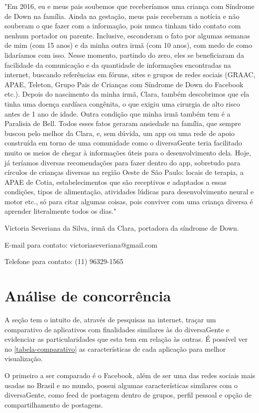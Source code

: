 "Em 2016, eu e meus pais soubemos que receberíamos uma criança com Síndrome de Down na família. Ainda na gestação, meus pais receberam a notícia e não souberam o que fazer com a informação, pois nunca tinham tido contato com nenhum portador ou parente. Inclusive, esconderam o fato por algumas semanas de mim (com 15 anos) e da minha outra irmã (com 10 anos), com medo de como lidaríamos com isso. Nesse momento, partindo do zero, eles se beneficiaram da facilidade da comunicação e da quantidade de informações encontradas na internet, buscando referências em fóruns, sites e grupos de redes sociais (GRAAC, APAE, Teleton, Grupo Pais de Crianças com Síndrome de Down do Facebook etc.). Depois do nascimento da minha irmã, Clara, também descobrimos que ela tinha uma doença cardíaca congênita, o que exigiu uma cirurgia de alto risco antes de 1 ano de idade. Outra condição que minha irmã também tem é a Paralisia de Bell. Todos esses fatos geraram ansiedade na família, que sempre buscou pelo melhor da Clara, e, sem dúvida, um app ou uma rede de apoio construída em torno de uma comunidade como o diversaGente teria facilitado muito os meios de chegar à informações úteis para o desenvolvimento dela. Hoje, já teríamos diversas recomendações para fazer dentro do app, sobretudo para círculos de crianças diversas na região Oeste de São Paulo: locais de terapia, a APAE de Cotia, estabelecimentos que são receptivos e adaptados a essas condições, tipos de alimentação, atividades lúdicas para desenvolvimento neural e motor etc., só para citar algumas coisas, pois conviver com uma criança diversa é aprender literalmente todos os dias."

Victoria Severiana da Silva, irmã da Clara, portadora da síndrome de Down.


E-mail para contato: victoriaseveriana@gmail.com


Telefone para contato: (11) 96329-1565


\section{Análise de concorrência}

A seção tem o intuito de, através de pesquisas na internet, traçar um comparativo de aplicativos com finalidades similares às do diversaGente e evidenciar as particularidades que esta tem em relação às outras. É possível ver no \autoref{tabela-comparativo} as características de cada aplicação para melhor visualização. 

O primeiro a ser comparado é o Facebook, além de ser uma das redes sociais mais usadas no Brasil e no mundo, possui algumas características similares com o diversaGente, como feed de postagem dentro de grupos, perfil pessoal e opção de compartilhamento de postagens. 

